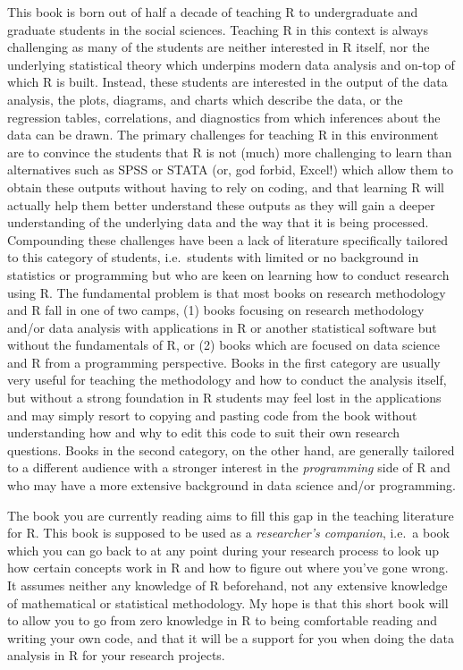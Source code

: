 \documentclass[
]{book}
\begin{document}
This book is born out of half a decade of teaching R to undergraduate and graduate students in the social sciences. Teaching R in this context is always challenging as many of the students are neither interested in R itself, nor the underlying statistical theory which underpins modern data analysis and on-top of which R is built. Instead, these students are interested in the output of the data analysis, the plots, diagrams, and charts which describe the data, or the regression tables, correlations, and diagnostics from which inferences about the data can be drawn. The primary challenges for teaching R in this environment are to convince the students that R is not (much) more challenging to learn than alternatives such as SPSS or STATA (or, god forbid, Excel!) which allow them to obtain these outputs without having to rely on coding, and that learning R will actually help them better understand these outputs as they will gain a deeper understanding of the underlying data and the way that it is being processed. Compounding these challenges have been a lack of literature specifically tailored to this category of students, i.e.~students with limited or no background in statistics or programming but who are keen on learning how to conduct research using R. The fundamental problem is that most books on research methodology and R fall in one of two camps, (1) books focusing on research methodology and/or data analysis with applications in R or another statistical software but without the fundamentals of R, or (2) books which are focused on data science and R from a programming perspective. Books in the first category are usually very useful for teaching the methodology and how to conduct the analysis itself, but without a strong foundation in R students may feel lost in the applications and may simply resort to copying and pasting code from the book without understanding how and why to edit this code to suit their own research questions. Books in the second category, on the other hand, are generally tailored to a different audience with a stronger interest in the \emph{programming} side of R and who may have a more extensive background in data science and/or programming.

The book you are currently reading aims to fill this gap in the teaching literature for R. This book is supposed to be used as a \emph{researcher's companion}, i.e.~a book which you can go back to at any point during your research process to look up how certain concepts work in R and how to figure out where you've gone wrong. It assumes neither any knowledge of R beforehand, not any extensive knowledge of mathematical or statistical methodology. My hope is that this short book will to allow you to go from zero knowledge in R to being comfortable reading and writing your own code, and that it will be a support for you when doing the data analysis in R for your research projects.
\end{document}

